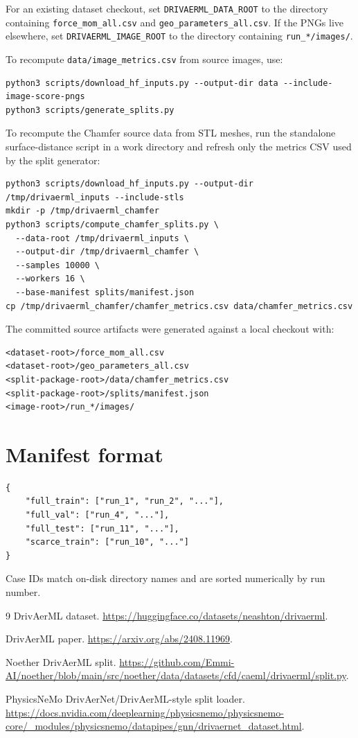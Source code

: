 \documentclass[10pt]{article}
\newcommand{\code}[1]{\texttt{#1}}
\begin{document}
For an existing dataset checkout, set \code{DRIVAERML\_DATA\_ROOT} to the
directory containing \code{force\_mom\_all.csv} and
\code{geo\_parameters\_all.csv}. If the PNGs live elsewhere, set
\code{DRIVAERML\_IMAGE\_ROOT} to the directory containing
\code{run\_*/images/}.

To recompute \code{data/image\_metrics.csv} from source images, use:

\begin{verbatim}
python3 scripts/download_hf_inputs.py --output-dir data --include-image-score-pngs
python3 scripts/generate_splits.py
\end{verbatim}

To recompute the Chamfer source data from STL meshes, run the standalone
surface-distance script in a work directory and refresh only the metrics CSV
used by the split generator:

\begin{verbatim}
python3 scripts/download_hf_inputs.py --output-dir /tmp/drivaerml_inputs --include-stls
mkdir -p /tmp/drivaerml_chamfer
python3 scripts/compute_chamfer_splits.py \
  --data-root /tmp/drivaerml_inputs \
  --output-dir /tmp/drivaerml_chamfer \
  --samples 10000 \
  --workers 16 \
  --base-manifest splits/manifest.json
cp /tmp/drivaerml_chamfer/chamfer_metrics.csv data/chamfer_metrics.csv
\end{verbatim}

The committed source artifacts were generated against a local checkout with:

\begin{verbatim}
<dataset-root>/force_mom_all.csv
<dataset-root>/geo_parameters_all.csv
<split-package-root>/data/chamfer_metrics.csv
<split-package-root>/splits/manifest.json
<image-root>/run_*/images/
\end{verbatim}

\section*{Manifest format}

\begin{verbatim}
{
    "full_train": ["run_1", "run_2", "..."],
    "full_val": ["run_4", "..."],
    "full_test": ["run_11", "..."],
    "scarce_train": ["run_10", "..."]
}
\end{verbatim}

Case IDs match on-disk directory names and are sorted numerically by run number.

\begin{thebibliography}{9}
DrivAerML dataset. \url{https://huggingface.co/datasets/neashton/drivaerml}.

DrivAerML paper. \url{https://arxiv.org/abs/2408.11969}.

\bibitem{noether_split}
Noether DrivAerML split. \url{https://github.com/Emmi-AI/noether/blob/main/src/noether/data/datasets/cfd/caeml/drivaerml/split.py}.

\bibitem{physicsnemo_loader}
PhysicsNeMo DrivAerNet/DrivAerML-style split loader.
\url{https://docs.nvidia.com/deeplearning/physicsnemo/physicsnemo-core/_modules/physicsnemo/datapipes/gnn/drivaernet_dataset.html}.
\end{thebibliography}
\end{document}
